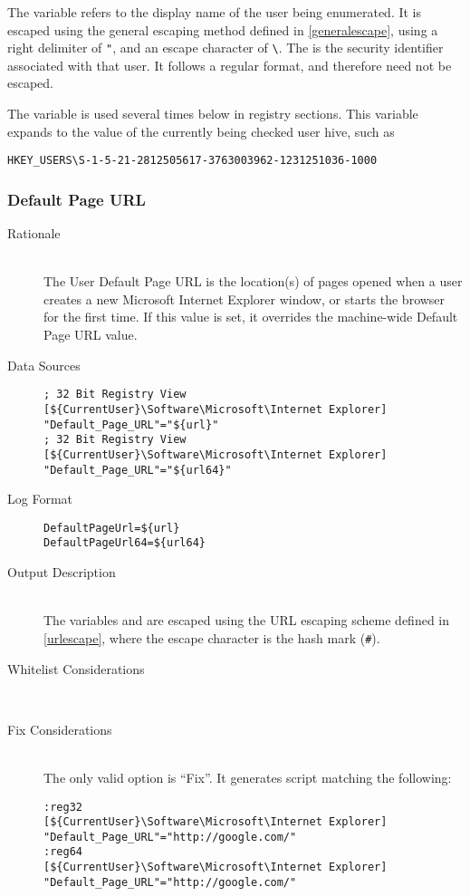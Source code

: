 The variable  refers to the display name of the user being
enumerated. It is escaped using the general escaping method defined in
\ref{generalescape}, using a right delimiter of \verb|"|, and an escape
character of \verb|\|. The  is the security identifier associated with
that user. It follows a regular format, and therefore need not be escaped.

The variable  is used several times below in registry sections.
This variable expands to the value of the currently being checked user hive,
such as
\begin{verbatim}
HKEY_USERS\S-1-5-21-2812505617-3763003962-1231251036-1000
\end{verbatim}

\subsubsection{Default Page URL}
\begin{description}
\item[Rationale] \hfill \\
The User Default Page URL is the location(s) of pages opened when a user creates
a new Microsoft Internet Explorer window, or starts the browser for the first
time. If this value is set, it overrides the machine-wide Default Page URL
value.

\item[Data Sources] \hfill
\vspace{-\baselineskip}
\begin{verbatim}
; 32 Bit Registry View
[${CurrentUser}\Software\Microsoft\Internet Explorer]
"Default_Page_URL"="${url}"
; 32 Bit Registry View
[${CurrentUser}\Software\Microsoft\Internet Explorer]
"Default_Page_URL"="${url64}"
\end{verbatim}
\item[Log Format] \hfill
\vspace{-\baselineskip}
\begin{verbatim} 
DefaultPageUrl=${url}
DefaultPageUrl64=${url64}
\end{verbatim}
\item[Output Description] \hfill \\
The variables  and  are escaped using the URL escaping
scheme defined in \ref{urlescape}, where the escape character is the hash mark
(\verb|#|). 
\item[Whitelist Considerations] \hfill \\

\item[Fix Considerations] \hfill \\
The only valid option is ``Fix''. It generates script matching the following:
\vspace{-\baselineskip}
\begin{verbatim}
:reg32
[${CurrentUser}\Software\Microsoft\Internet Explorer]
"Default_Page_URL"="http://google.com/"
:reg64
[${CurrentUser}\Software\Microsoft\Internet Explorer]
"Default_Page_URL"="http://google.com/"
\end{verbatim}
\end{description}

